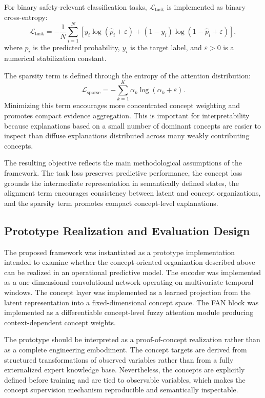 \documentclass[runningheads]{llncs}
\begin{document}
For binary safety-relevant classification tasks, $\mathcal{L}_{\mathrm{task}}$ is implemented as binary cross-entropy:
\begin{equation}
\mathcal{L}_{\mathrm{task}}
=
-\frac{1}{N}\sum_{i=1}^{N}
\left[
y_i\log(\hat{p}_i+\varepsilon)
+
(1-y_i)\log(1-\hat{p}_i+\varepsilon)
\right],
\end{equation}
where $\hat{p}_i$ is the predicted probability, $y_i$ is the target label, and $\varepsilon>0$ is a numerical stabilization constant.

The sparsity term is defined through the entropy of the attention distribution:
\begin{equation}
\mathcal{L}_{\mathrm{sparse}}
=
-\sum_{k=1}^{K}\alpha_k\log(\alpha_k+\varepsilon).
\end{equation}
Minimizing this term encourages more concentrated concept weighting and promotes compact evidence aggregation. This is important for interpretability because explanations based on a small number of dominant concepts are easier to inspect than diffuse explanations distributed across many weakly contributing concepts.

The resulting objective reflects the main methodological assumptions of the framework. The task loss preserves predictive performance, the concept loss grounds the intermediate representation in semantically defined states, the alignment term encourages consistency between latent and concept organizations, and the sparsity term promotes compact concept-level explanations.

\subsection{Prototype Realization and Evaluation Design}

The proposed framework was instantiated as a prototype implementation intended to examine whether the concept-oriented organization described above can be realized in an operational predictive model. The encoder was implemented as a one-dimensional convolutional network operating on multivariate temporal windows. The concept layer was implemented as a learned projection from the latent representation into a fixed-dimensional concept space. The FAN block was implemented as a differentiable concept-level fuzzy attention module producing context-dependent concept weights.

The prototype should be interpreted as a proof-of-concept realization rather than as a complete engineering embodiment. The concept targets are derived from structured transformations of observed variables rather than from a fully externalized expert knowledge base. Nevertheless, the concepts are explicitly defined before training and are tied to observable variables, which makes the concept supervision mechanism reproducible and semantically inspectable.
\end{document}
